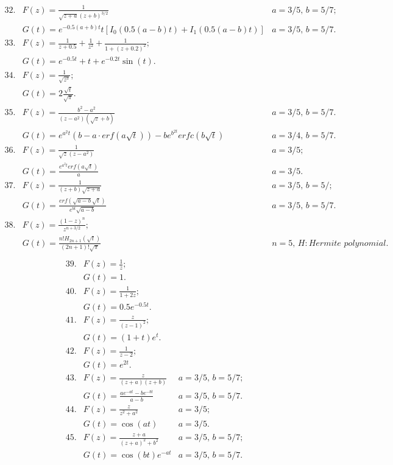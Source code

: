 \documentclass[10pt]{article}
\begin{document}
\[
\begin{array}{llr}
32. & F(z)= \frac{1}{\sqrt{z+a}(z+b)^{3/2}} & a=3/5, \, b=5/7; \\[1cm]
  & G(t)= e^{-0.5(a+b)t}t \left [I_0(0.5(a-b)t)+I_1(0.5(a-b)t)\right ] &a=3/5, \, b=5/7.\\[1cm]
33. & F(z)= \frac{1}{z+0.5}+\frac{1}{z^{2}}+\frac{1}{1+(z+0.2)^{2}}; & \\[1cm]
  & G(t)= e^{-0.5t}+t+e^{-0.2t}\sin(t).& \\[1cm]
34. & F(z)= \frac{1}{\sqrt{z^{3}}}; & \\[1cm]
  & G(t)= 2\frac{\sqrt{t}}{\sqrt{\pi}}.&\\[1cm]
35. & F(z)= \frac{b^{2}-a^{2}}{(z-a^{2})(\sqrt{z}+b)} &a=3/5, \, b=5/7. \\[1cm]
  & G(t)= e^{a^{2}t}(b-a \cdot erf(a\sqrt{t}))-b e^{b^{2t}}erfc(b\sqrt{t})&a=3/4, \, b=5/7. \\[1cm]
36. & F(z)= \frac{1}{\sqrt{z}(z-a^{2})} &a=3/5; \\[1cm]
  & G(t)= \frac{e^{a^{2}t}erf(a\sqrt{t})}{a}& a=3/5.\\[1cm]
37. & F(z)= \frac{1}{(z+b)\sqrt{z+a}} &a=3/5, \, b=5/; \\[1cm]
  & G(t)= \frac{erf(\sqrt{a-b}\sqrt{t})}{e^{bt}\sqrt{a-b}}& a=3/5, \, b=5/7.\\[1cm]
38. & F(z)= \frac{(1-z)^{n}}{z^{n+3/2}}; & \\[1cm]
  & G(t)= \frac{n! H_{2n+1}(\sqrt{t})}{(2n+1)!\sqrt{\pi}}& n=5, \, H: Hermite\,\, polynomial. \\[1cm]
\end{array}
 \]
\[
\begin{array}{llr}
39. & F(z)= \frac{1}{z}; &\\[1cm]
  & G(t)= 1.&\\[1cm]
40. & F(z)= \frac{1}{1+2z}; & \\[1cm]
  & G(t)= 0.5e^{-0.5t}.& \\[1cm]
41. & F(z)= \frac{z}{(z-1)^{2}}; & \\[1cm]
  & G(t)= (1+t)e^{t}.& \\[1cm]
42. & F(z)= \frac{1}{z-2};& \\[1cm]
  & G(t)= e^{2t}.& \\[1cm]
43. & F(z)= \frac{z}{(z+a)(z+b)} &a=3/5, \, b=5/7; \\[1cm]
  & G(t)= \frac{ae^{-at}-be^{-bt}}{a-b}&a=3/5, \, b=5/7. \\[1cm]
44. & F(z)= \frac{z}{z^{2}+a^{2}} &a=3/5; \\[1cm]
  & G(t)= \cos(at)&a=3/5. \\[1cm]
45. & F(z)= \frac{z+a}{(z+a)^{2}+b^{2}} &a=3/5, \, b=5/7; \\[1cm]
  & G(t)= \cos(bt)e^{-at}& a=3/5, \, b=5/7.
 \end{array}
\]
\end{document}

